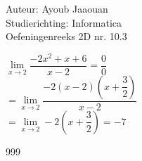 \documentclass[a4paper]{article}
\begin{document}
\noindent \large Auteur: Ayoub Jaaouan \\
\noindent \large Studierichting: Informatica\\
\noindent \large Oefeningenreeks 2D nr. 10.3\\

\medskip

\normalsize

$\lim\limits_{x \rightarrow 2} \dfrac{-2x^2+x+6}{x-2} = \dfrac{0}{0} $\\

$= \lim\limits_{x \rightarrow 2} \dfrac{-2(x-2)\left(x+\dfrac{3}{2}\right)}{x-2}  $\\

$=\lim\limits_{x \rightarrow 2} -2\left(x+\dfrac{3}{2}\right) = -7  $\\


\begin{thebibliography}{999}
\end{thebibliography}
\end{document}
